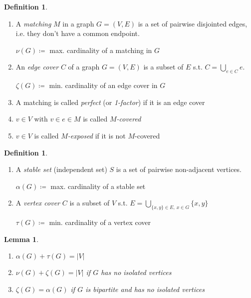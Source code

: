 \documentclass[11pt, a4paper]{article}
\newcommand{\abs}[1]{\left\lvert#1\right\rvert}
\newtheorem{lemma}[theorem]{Lemma}
\theoremstyle{remark}
\theoremstyle{definition}
\newtheorem{definition}[theorem]{Definition}
\begin{document}
\begin{definition}\ 
\begin{enumerate}
	\item A \emph{matching} $M$ in a graph $G=(V,E)$ is a set of
	pairwise disjointed edges, i.e. they don't have a common endpoint.

	$\nu(G)\coloneqq$ max. cardinality of a matching in $G$

	\item An \emph{edge cover} $C$ of a graph $G=(V,E)$ is a subset
	of $E$ s.t.  $C=\bigcup_{e\in C}e$.

	$\zeta(G) \coloneqq$ min. cardinality of an edge cover in $G$
	
	\item A matching is called \emph{perfect} (or \emph{1-factor})
	if it is an edge cover
	
	\item $v\in V$ with $v\in e\in M$ is called \emph{$M$-covered}
	
	\item $v\in V$ is called \emph{$M$-exposed} if it is not
	$M$-covered
\end{enumerate}
\end{definition}

\begin{definition}\ 
\begin{enumerate}
	\item A \emph{stable set} (independent set) $S$ is a set of
	pairwise non-adjacent vertices.
	
	$\alpha(G)\coloneqq$ max. cardinality of a stable set
	
	\item A \emph{vertex cover} $C$ is a subset of $V$ s.t.
	$E=\bigcup_{\{x,y\}\in E,\ x\in G}\{x,y\}$
	
	$\tau(G)\coloneqq$ min. cardinality of a vertex cover
\end{enumerate}
\end{definition}

\begin{lemma}\ 
\begin{enumerate}
	\item $\alpha(G)+\tau(G) = \abs{V}$
	\item $\nu(G) + \zeta(G) = \abs{V}$ if $G$ has no isolated vertices
	\item $\zeta(G)=\alpha(G)$ if $G$ is bipartite and has no isolated
	vertices
\end{enumerate}
\end{lemma}
\end{document}
